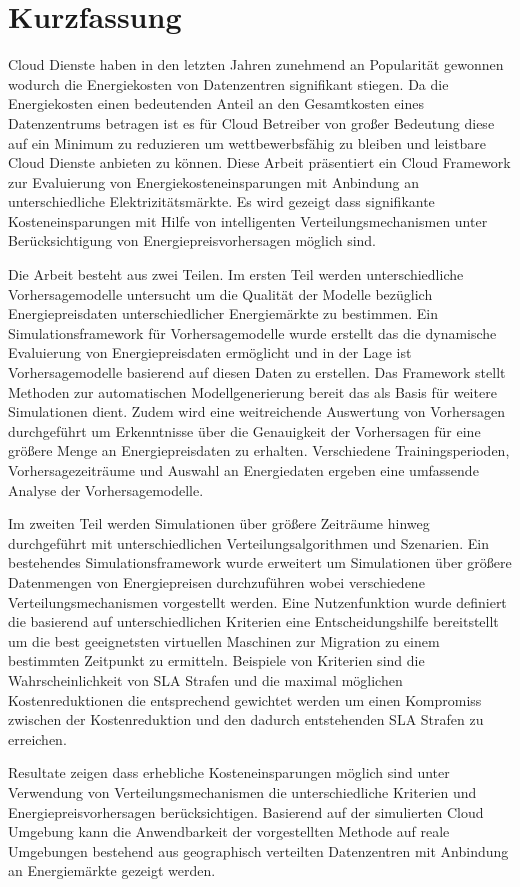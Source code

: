\chapter*{Kurzfassung}

Cloud Dienste haben in den letzten Jahren zunehmend an Popularität gewonnen wodurch die Energiekosten von Datenzentren signifikant stiegen. 
Da die Energiekosten einen bedeutenden Anteil an den Gesamtkosten eines Datenzentrums betragen ist es für Cloud Betreiber von großer Bedeutung diese auf ein Minimum zu reduzieren um wettbewerbsfähig zu bleiben und leistbare Cloud Dienste anbieten zu können. 
Diese Arbeit präsentiert ein Cloud Framework zur Evaluierung von Energiekosteneinsparungen mit Anbindung an unterschiedliche Elektrizitätsmärkte. Es wird gezeigt dass signifikante Kosteneinsparungen mit Hilfe von intelligenten Verteilungsmechanismen unter Berücksichtigung von Energiepreisvorhersagen möglich sind. 


Die Arbeit besteht aus zwei Teilen. Im ersten Teil werden unterschiedliche Vorhersagemodelle untersucht um die Qualität der Modelle bezüglich Energiepreisdaten unterschiedlicher Energiemärkte zu bestimmen. Ein Simulationsframework für Vorhersagemodelle wurde erstellt das die dynamische Evaluierung von Energiepreisdaten ermöglicht und in der Lage ist Vorhersagemodelle basierend auf diesen Daten zu erstellen. 
Das Framework stellt Methoden zur automatischen Modellgenerierung bereit das als Basis für weitere Simulationen dient. 
Zudem wird eine weitreichende Auswertung von Vorhersagen durchgeführt um Erkenntnisse über die Genauigkeit der Vorhersagen für eine größere Menge an Energiepreisdaten zu erhalten. Verschiedene Trainingsperioden, Vorhersagezeiträume und Auswahl an Energiedaten ergeben eine umfassende Analyse der Vorhersagemodelle. 


Im zweiten Teil werden Simulationen über größere Zeiträume hinweg durchgeführt mit unterschiedlichen Verteilungsalgorithmen und Szenarien. Ein bestehendes Simulationsframework wurde erweitert um Simulationen über größere Datenmengen von Energiepreisen durchzuführen wobei verschiedene Verteilungsmechanismen vorgestellt werden. 
Eine Nutzenfunktion wurde definiert die basierend auf unterschiedlichen Kriterien eine Entscheidungshilfe bereitstellt um die best geeignetsten virtuellen Maschinen zur Migration zu einem bestimmten Zeitpunkt zu ermitteln. 
Beispiele von Kriterien sind die Wahrscheinlichkeit von SLA Strafen und die maximal möglichen Kostenreduktionen die entsprechend gewichtet werden um einen Kompromiss zwischen der Kostenreduktion und den dadurch entstehenden SLA Strafen zu erreichen. 


Resultate zeigen dass erhebliche Kosteneinsparungen möglich sind unter Verwendung von Verteilungsmechanismen die unterschiedliche Kriterien und Energiepreisvorhersagen berücksichtigen. Basierend auf der simulierten Cloud Umgebung kann die Anwendbarkeit der vorgestellten Methode auf reale Umgebungen bestehend aus geographisch verteilten Datenzentren mit Anbindung an Energiemärkte gezeigt werden. 




